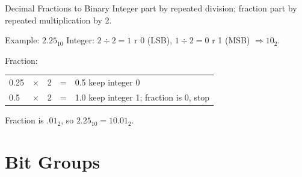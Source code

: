 \documentclass[9pt,aspectratio=169,xcolor=table]{beamer}
\begin{document}
\begin{frame}{Decimal Fractions to Binary}
  Integer part by repeated division; fraction part by repeated \alert{multiplication} by 2.
  \begin{block}{Example: $2.25_{10}$}
    \small
    Integer: $2 \div 2 = 1$ r 0 (LSB), $1 \div 2 = 0$ r 1 (MSB) $\Rightarrow 10_2$.

    \vspace{2mm}
    Fraction:
    \begin{center}
    \begin{tabular}{lcccl}
      0.25 & $\times$ & 2 & = & 0.5 \quad keep integer 0 \\
      0.5  & $\times$ & 2 & = & 1.0 \quad keep integer 1; fraction is 0, stop \\
    \end{tabular}
    \end{center}
    Fraction is $.01_2$, so $2.25_{10} = 10.01_2$.
  \end{block}
\end{frame}

\section{Bit Groups}
\end{document}
